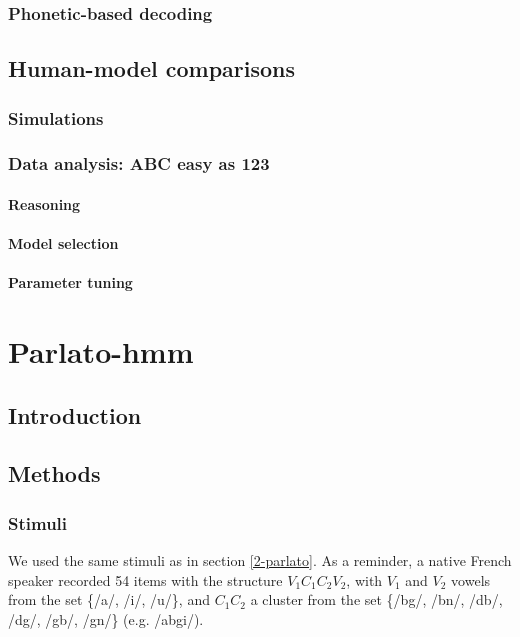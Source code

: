 \subsubsection{Phonetic-based decoding}

\subsection{Human-model comparisons} \label{3-methods_comparison}
\subsubsection{Simulations}
\subsubsection{Data analysis: ABC easy as 123} \label{3-methods_comparison_ABC}
\paragraph{Reasoning}
\paragraph{Model selection}
\paragraph{Parameter tuning}


\section{{\color{red}Parlato-hmm}} \label{3-parlato-hmm}
\subsection{Introduction}
\subsection{Methods}
\subsubsection{Stimuli}
We used the same stimuli as in section \ref{2-parlato}. As a reminder, a native French speaker recorded 54 items with the structure $V_{1}C_{1}C_{2}V_{2}$, with $V_{1}$ and $V_{2}$ vowels from the set \{/a/, /i/, /u/\}, and $C_{1}C_{2}$ a cluster from the set \{/bg/, /bn/, /db/, /dg/, /gb/, /gn/\} (e.g. /abgi/).

